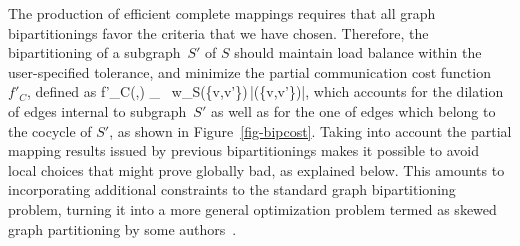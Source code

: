 The production of efficient complete mappings requires that all graph
bipartitionings favor the criteria that we have chosen.
Therefore, the bipartitioning of a subgraph~$S'$ of $S$ should maintain
load balance within the user-specified tolerance, and minimize the
partial communication cost function $f'_C$, defined as
\bn
f'_C(,) \eqdef
\hspace*{-0.45cm}\sum\limits_{\mbox{\scriptsize
             }}\hspace*{-0.45cm}
w_S(\{v,v'\})\,|(\{v,v'\})|\enspace,
\en
which accounts for the dilation of edges internal to subgraph~$S'$ as well as
for the one of edges which belong to the cocycle of $S'$, as shown in
Figure~\ref{fig-bipcost}.
Taking into account the partial mapping results issued by previous
bipartitionings makes it possible to avoid local choices that
might prove globally bad, as explained below.
This amounts to incorporating additional constraints to the standard graph
bipartitioning problem, turning it into a more general optimization problem
termed as skewed graph partitioning by some authors~\cite{heledr97}.

